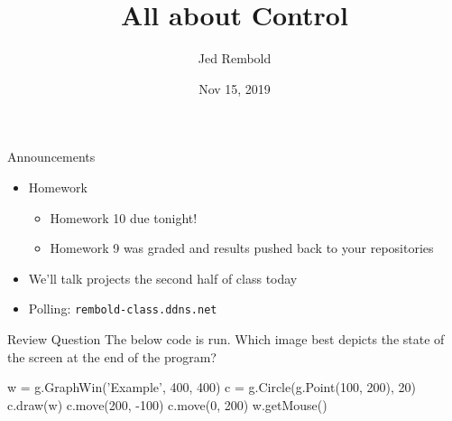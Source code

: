 \documentclass[pdf, aspectratio=169, 12pt]{beamer}
\title{All about Control}
\author{Jed Rembold}
\date{Nov 15, 2019}
\begin{document}
\begin{frame}{Announcements}
	\begin{itemize}
		\item Homework
			\begin{itemize}
				\item Homework 10 due tonight!
				\item Homework 9 was graded and results pushed back to your repositories
			\end{itemize}
		\item We'll talk projects the second half of class today
		\item Polling: \nolinkurl{rembold-class.ddns.net}
	\end{itemize}
\end{frame}

\begin{frame}[fragile]{Review Question}
	\vspace{4mm}
	The below code is run. Which image best depicts the state of the screen at the end of the program?
	\small
	\begin{pythoncode}
		w = g.GraphWin('Example', 400, 400)
		c = g.Circle(g.Point(100, 200), 20)
		c.draw(w)
		c.move(200, -100)
		c.move(0, 200)
		w.getMouse()
	\end{pythoncode}
	\begin{center}
		\vspace{-7mm}
	\end{center}
\end{frame}
\end{document}
